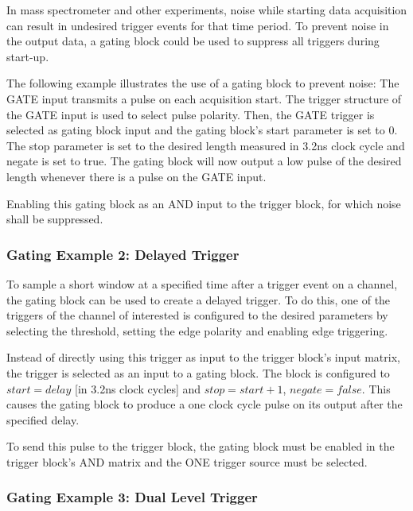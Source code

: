             In mass spectrometer and other experiments, noise while starting data acquisition can result in undesired trigger events for that time period. To prevent noise in the output data, a gating block could be used to suppress all triggers during start-up.\par

            The following example illustrates the use of a gating block to prevent noise: The GATE input transmits a pulse on each acquisition start. The trigger structure of the GATE input is used to select pulse polarity. Then, the GATE trigger is selected as gating block input and the gating block's start parameter is set to 0. The stop parameter is set to the desired length measured in 3.2ns clock cycle and negate is set to true. The gating block will now output a low pulse of the desired length whenever there is a pulse on the GATE input.\par

        Enabling this gating block as an AND input to the trigger block, for which noise shall be suppressed.

        \subsubsection{Gating Example 2: Delayed Trigger}

            To sample a short window at a specified time after a trigger event on a channel, the gating block can be used to create a delayed trigger. To do this, one of the triggers of the channel of interested is configured to the desired parameters by selecting the threshold, setting the edge polarity and enabling edge triggering.\par

            Instead of directly using this trigger as input to the trigger block's input matrix, the trigger is selected as an input to a gating block. The block is configured to $start = delay$ [in 3.2ns clock cycles] and $stop = start+1$, $negate = false$. This causes the gating block to produce a one clock cycle pulse on its output after the specified delay.\par

            To send this pulse to the trigger block, the gating block must be enabled in the trigger block's AND matrix and the ONE trigger source must be selected.

        \subsubsection{Gating Example 3: Dual Level Trigger}

